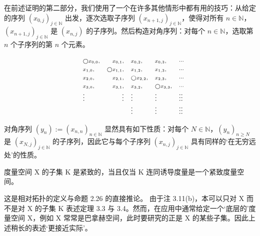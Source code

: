 \begin{remark}

\begin{items}
\item

在前述证明的第二部分，我们使用了一个在许多其他情形中都有用的技巧：从给定的序列 $ (x_{0,j})_{j\in\mathbb{N}} $ 出发，逐次选取子序列 $ (x_{n+1,j})_{j\in\mathbb{N}} $，使得对所有 $ n\in\mathbb{N} $，$ (x_{n+1,j})_{j\in\mathbb{N}} $ 是 $ (x_{n,j}) $ 的子序列。然后构造对角序列：对每个 $ n\in\mathbb{N} $，选取第 $ n $ 个子序列的第 $ n $ 个元素。

\begin{equation*}
\begin{array}{r l r lll}&{\scriptstyle\bigcirc\scriptstyle{x_{0,0}},}&{\scriptstyle x_{0,1},}&{\scriptstyle x_{0,2},}&{\scriptstyle x_{0,3},}&{\scriptstyle \cdots}\\ &{\scriptstyle x_{1,0},}&{\scriptstyle\bigcirc\scriptstyle{x_{1,1}},}&{\scriptstyle x_{1,2},}&{\scriptstyle x_{1,3},}&{\scriptstyle \cdots}\\ &{\scriptstyle x_{2,0},}&{\scriptstyle x_{2,1},}&{\scriptstyle\bigcirc\scriptstyle{x_{2,2}},}&{\scriptstyle x_{2,3},}&{\scriptstyle \cdots}\\ &{\scriptstyle x_{3,0},}&{\scriptstyle x_{3,1},}&{\scriptstyle x_{3,2},}&{\scriptstyle\bigcirc\scriptstyle{x_{3,3}},}&{\scriptstyle \cdots}\\ &{\vdots}&{\vdots}&{\vdots}&{\vdots}&{\vdots\vdots}\\ &{\qquad}&{\qquad}&{\vdots}&{\vdots}&{\vdots\vdots}\end{array}
\end{equation*}

对角序列 $ (y_n) := (x_{n,n})_{n \in \mathbb{N}} $ 显然具有如下性质：对每个 $ N \in \mathbb{N} $，$ (y_n)_{n \geq N} $ 是 $ (x_{N,j})_{j \in \mathbb{N}} $ 的子序列，因此它与每个子序列 $ (x_{n,j})_{j \in \mathbb{N}} $ 具有同样的‘在无穷远处’的性质。

\item

度量空间 X 的子集 K 是紧致的，当且仅当 K 连同诱导度量是一个紧致度量空间。

\proofhead
这是相对拓扑的定义与命题 2.26 的直接推论。
由于注 3.11(b)，本可以只对 X 而不是对 X 的子集 K 表述定理 3.3 与 3.4。然而，在应用中通常给定一个‘底层的’度量空间 X，例如 X 常常是巴拿赫空间，此时要研究的正是 X 的某些子集。因此上述稍长的表述‘更接近实际’。
\end{items}

\end{remark}

